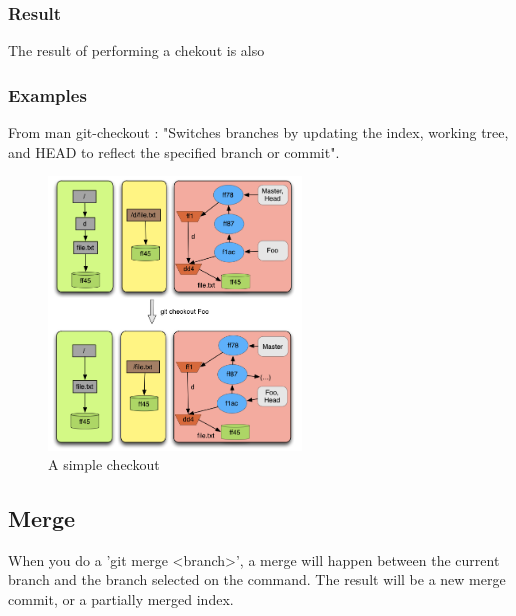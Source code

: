 \subsubsection{Result}
The result of performing a chekout is also 

\subsubsection{Examples}
From man git-checkout : "Switches branches by updating the index, 
working tree, and HEAD to reflect the specified branch or commit". \par
\begin{figure}[!t]
   \centering
   \includegraphics[width=0.6\textwidth]{images/checkout.png}
   \caption{A simple checkout}\label{fig:checkout}
\end{figure}

\subsection{Merge}


When you do a 'git merge <branch>', a merge will happen between the current
branch and the branch selected on the command. The result will be a new merge 
commit, or a partially merged index. \par

